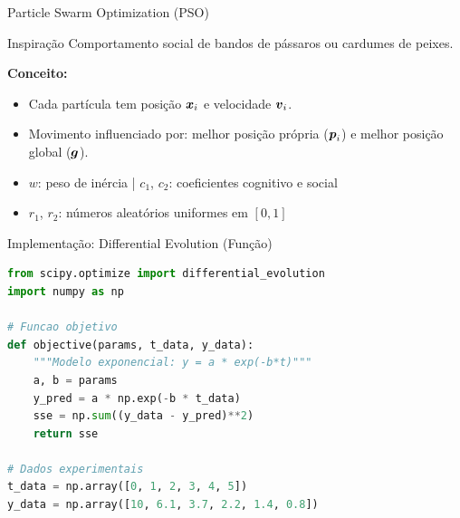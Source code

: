 \begin{frame}{Particle Swarm Optimization (PSO)}
\begin{block}{Inspiração}
Comportamento social de bandos de pássaros ou cardumes de peixes.
\end{block}

\textbf{Conceito:}
\begin{itemize}\small
    \item Cada partícula tem posição $\boldsymbol{x}_i$ e velocidade $\boldsymbol{v}_i$.
    \item Movimento influenciado por: melhor posição própria ($\boldsymbol{p}_i$) e melhor posição global ($\boldsymbol{g}$).
\end{itemize}


\begin{itemize}\small
    \item $w$: peso de inércia | $c_1$, $c_2$: coeficientes cognitivo e social
    \item $r_1$, $r_2$: números aleatórios uniformes em $[0,1]$
\end{itemize}
\end{frame}

\begin{frame}[fragile]{Implementação: Differential Evolution (Função)}
\begin{lstlisting}[language=Python, caption=Modelo e funcao objetivo para DE, basicstyle=\ttfamily\footnotesize]
from scipy.optimize import differential_evolution
import numpy as np

# Funcao objetivo
def objective(params, t_data, y_data):
    """Modelo exponencial: y = a * exp(-b*t)"""
    a, b = params
    y_pred = a * np.exp(-b * t_data)
    sse = np.sum((y_data - y_pred)**2)
    return sse

# Dados experimentais
t_data = np.array([0, 1, 2, 3, 4, 5])
y_data = np.array([10, 6.1, 3.7, 2.2, 1.4, 0.8])
\end{lstlisting}
\end{frame}

